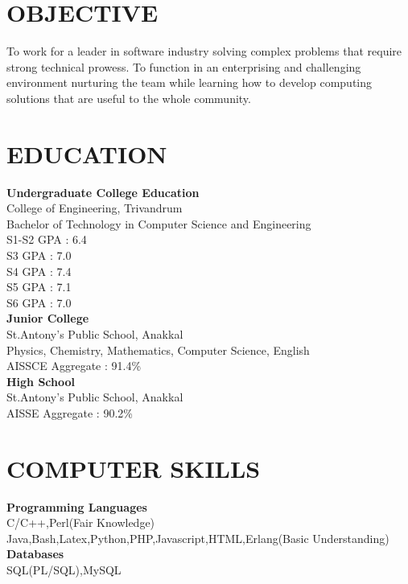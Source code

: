 \documentclass[line,margin]{res}
\begin{document}


\address{joji\_antony@gmx.com}
\address{+91 98092 28749}

\begin{resume}
\section{OBJECTIVE}
To work for a leader in software industry solving complex problems that require strong technical prowess. To function in an enterprising and challenging environment nurturing the team while learning how to develop computing solutions that are useful to the whole community.

\section{EDUCATION}

{\bf Undergraduate College Education}\\
College of Engineering, Trivandrum\\
Bachelor of Technology in Computer Science and Engineering\\
S1-S2 GPA : 6.4\\
S3 GPA    : 7.0\\
S4 GPA    : 7.4\\
S5 GPA    : 7.1\\
S6 GPA    : 7.0\\

{\bf Junior College} \\
St.Antony's Public School, Anakkal\\
Physics, Chemistry, Mathematics, Computer Science, English\\
AISSCE Aggregate : 91.4\%\\

{\bf High School} \\
St.Antony's Public School, Anakkal\\
AISSE Aggregate : 90.2\%\\

\section{COMPUTER SKILLS}
{\bf Programming Languages}\\
C/C++,Perl(Fair Knowledge)\\
Java,Bash,Latex,Python,PHP,Javascript,HTML,Erlang(Basic Understanding)\\
{\bf Databases}\\
SQL(PL/SQL),MySQL\\


\end{resume}
\end{document}
